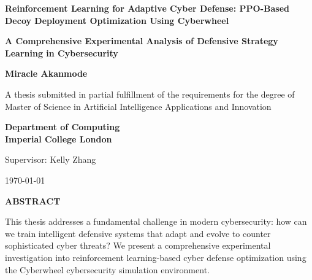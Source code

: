 \documentclass[12pt,twoside]{article}
\newcommand{\thesistitle}{Reinforcement Learning for Adaptive Cyber Defense: PPO-Based Decoy Deployment Optimization Using Cyberwheel}
\newcommand{\thesisauthor}{Miracle Akanmode}
\newcommand{\supervisor}{Kelly Zhang}
\newcommand{\degreetype}{Artificial Intelligence Applications and Innovation}
\newcommand{\university}{Imperial College London}
\newcommand{\department}{Department of Computing}
\newcommand{\submissiondate}{\today}
\theoremstyle{definition}
\theoremstyle{plain}
\begin{document}
\begin{titlepage}
\begin{center}
\vspace*{2cm}

{\Huge\textbf{\thesistitle}}

\vspace{1.5cm}

{\large\textbf{A Comprehensive Experimental Analysis of Defensive Strategy Learning in Cybersecurity}}

\vspace{2cm}

{\Large\textbf{\thesisauthor}}

\vspace{1.5cm}

{\large A thesis submitted in partial fulfillment of the requirements for the degree of \\ Master of Science in \degreetype}

\vspace{1.5cm}

{\large\textbf{\department} \\ \textbf{\university}}

\vspace{1cm}

{\large Supervisor: \supervisor}

\vspace{1.5cm}

{\large\submissiondate}

\end{center}
\end{titlepage}

\setcounter{page}{1}

\tableofcontents
\clearpage

\begin{center}
\large\textbf{ABSTRACT}
\end{center}

\vspace{1em}

This thesis addresses a fundamental challenge in modern cybersecurity: how can we train intelligent defensive systems that adapt and evolve to counter sophisticated cyber threats? We present a comprehensive experimental investigation into reinforcement learning-based cyber defense optimization using the Cyberwheel cybersecurity simulation environment.
\end{document}
